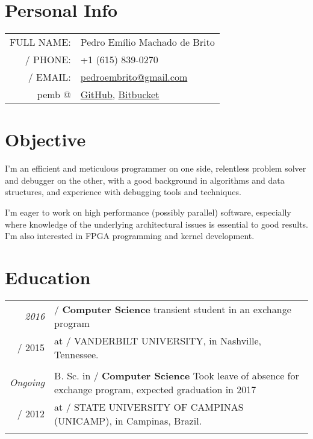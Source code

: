 \documentclass[a4paper,10pt]{article}
\makeatletter
\def\fakesc#1{%
  \begingroup%
  \xdef\fake@name{\csname\curr@fontshape/\f@size\endcsname}%
  \fontsize{\fontdimen8\fake@name}{\baselineskip}\selectfont%
  \uppercase{#1}%
  \endgroup%
}
\renewcommand{\textsc}{\fakesc}
\makeatother
\begin{document}
\pagestyle{empty} %

\par{\centering{\Huge Pedro \textsc{Brito}}\bigskip\par}

\section{Personal Info}

 \begin{tabularx}{\textwidth}{ rl}
 \textsc{Full name:} & Pedro Emílio Machado de Brito \\
    \textsc{Phone:} & +1 (615) 839-0270 \\
    \textsc{Email:} & \href{mailto:pedroembrito@gmail.com}{pedroembrito@gmail.com}\\
    \footnotesize{pemb @} & \href{https://github.com/pemb/}{GitHub}, \href{https://bitbucket.org/pemb}{Bitbucket}\\
\end{tabularx}

\section{Objective}

I'm an efficient and meticulous programmer on one side, relentless problem solver and debugger on the other, with a good background in algorithms and data structures, and experience with debugging tools and techniques.

I'm eager to work on high performance (possibly parallel) software, especially where knowledge of the underlying architectural issues is essential to good results. I'm also interested in FPGA programming and kernel development.

\section{Education}

\begin{tabularx}{\textwidth}{r|X}	

  \emph{2016} & \textsc{}\textbf{Computer Science} transient student in an exchange program  \\
  \textsc{2015} & at \textsc{Vanderbilt University,} \footnotesize{in Nashville, Tennessee.}\\
  \multicolumn{2}{c}{}\\

  \emph{Ongoing} & B. Sc. in \textsc{}\textbf{Computer Science} {\tiny Took leave of absence for exchange program, expected graduation in 2017} \\
  \textsc{2012} & at \textsc{State University of Campinas (Unicamp),} \footnotesize{in Campinas, Brazil.}\\
  \multicolumn{2}{c}{}\\

\end{tabularx}
\end{document}
